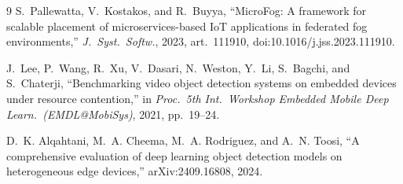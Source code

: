 \documentclass[conference]{IEEEtran}
\theoremstyle{remark}
\begin{document}
\begin{thebibliography}{9}
S.~Pallewatta, V.~Kostakos, and R.~Buyya, ``MicroFog: A framework for
scalable placement of microservices-based IoT applications in federated
fog environments,'' \emph{J.\ Syst.\ Softw.}, 2023, art.~111910,
doi:10.1016/j.jss.2023.111910.

J.~Lee, P.~Wang, R.~Xu, V.~Dasari, N.~Weston, Y.~Li, S.~Bagchi, and
S.~Chaterji, ``Benchmarking video object detection systems on embedded
devices under resource contention,'' in \emph{Proc.\ 5th Int.\ Workshop
Embedded Mobile Deep Learn.\ (EMDL@MobiSys)}, 2021, pp.\ 19--24.

D.~K. Alqahtani, M.~A. Cheema, M.~A. Rodriguez, and A.~N. Toosi, ``A
comprehensive evaluation of deep learning object detection models on
heterogeneous edge devices,'' arXiv:2409.16808, 2024.
\end{thebibliography}
\end{document}
